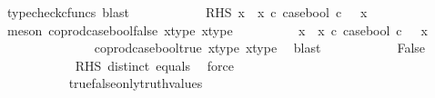 \begin{isabellebody}
\ {\isacharparenleft}{\kern0pt}typecheck{\isacharunderscore}{\kern0pt}cfuncs{\isacharcomma}{\kern0pt}\ blast{\isacharparenright}{\kern0pt}\isanewline
\ \ \ \ \ \ \ \ \isamarkupfalse%
\ \isamarkupfalse%
\ RHS{\isacharcolon}{\kern0pt}\ {\isachardoublequoteopen}{\isacharparenleft}{\kern0pt}x{}\ {\isasymamalg}\ x{}\ {\isasymcirc}\isactrlsub c\ case{\isacharunderscore}{\kern0pt}bool{\isacharparenright}{\kern0pt}\ {\isasymcirc}\isactrlsub c\ {\isasymomega}{}\ {\isacharequal}{\kern0pt}\ x{}{\isachardoublequoteclose}\isanewline
\ \ \ \ \ \ \ \ \ \ \isamarkupfalse%
\ {\isacharparenleft}{\kern0pt}meson\ coprod{\isacharunderscore}{\kern0pt}case{\isacharunderscore}{\kern0pt}bool{\isacharunderscore}{\kern0pt}false\ x{}{\isacharunderscore}{\kern0pt}type\ x{}{\isacharunderscore}{\kern0pt}type{\isacharparenright}{\kern0pt}\isanewline
\ \ \ \ \ \ \ \ \isamarkupfalse%
\ {\isachardoublequoteopen}{\isacharparenleft}{\kern0pt}x{}\ {\isasymamalg}\ x{}\ {\isasymcirc}\isactrlsub c\ case{\isacharunderscore}{\kern0pt}bool{\isacharparenright}{\kern0pt}\ {\isasymcirc}\isactrlsub c\ {\isasymomega}{}\ {\isacharequal}{\kern0pt}\ x{}{\isachardoublequoteclose}\isanewline
\ \ \ \ \ \ \ \ \ \ \isamarkupfalse%
\ {\isacartoucheopen}{\isasymomega}{}\ {\isacharequal}{\kern0pt}\ {\isasymt}{\isacartoucheclose}\ coprod{\isacharunderscore}{\kern0pt}case{\isacharunderscore}{\kern0pt}bool{\isacharunderscore}{\kern0pt}true\ x{}{\isacharunderscore}{\kern0pt}type\ x{}{\isacharunderscore}{\kern0pt}type\ \isamarkupfalse%
\ blast\isanewline
\ \ \ \ \ \ \ \ \isamarkupfalse%
\ \isamarkupfalse%
\ False\isanewline
\ \ \ \ \ \ \ \ \ \ \isamarkupfalse%
\ RHS\ distinct\ equals\ \isamarkupfalse%
\ force\isanewline
\ \ \ \ \ \ \isamarkupfalse%
\isanewline
\ \ \ \ \isamarkupfalse%
\isanewline
\ \ \ \ \ \ \isamarkupfalse%
\ {\isachardoublequoteopen}{\isasymomega}{}\ {\isasymnoteq}\ {\isasymt}{\isachardoublequoteclose}\isanewline
\ \ \ \ \ \ \isamarkupfalse%
\ \isamarkupfalse%
\ {\isachardoublequoteopen}{\isasymomega}{}\ {\isacharequal}{\kern0pt}\ {\isasymf}{\isachardoublequoteclose}\isanewline
\ \ \ \ \ \ \ \ \isamarkupfalse%
\ \ true{\isacharunderscore}{\kern0pt}false{\isacharunderscore}{\kern0pt}only{\isacharunderscore}{\kern0pt}truth{\isacharunderscore}{\kern0pt}values\ \isamarkupfalse%

\end{isabellebody}
